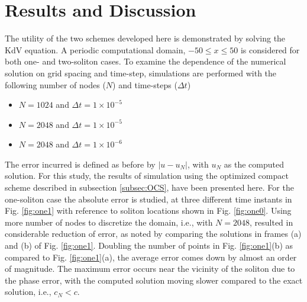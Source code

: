 \documentclass{svjour3}                    %
\begin{document}
\section{Results and Discussion}
\label{sec:res}
The utility of the two schemes developed here is demonstrated by solving the KdV equation. A periodic computational domain, $-50\leq x \leq 50$ is 
considered for both one- and two-soliton cases. To examine the dependence of the numerical solution on grid spacing and time-step, simulations are performed with the following number of nodes ($N$) and time-steps ($\Delta t$)
\begin{itemize}
  \item $N=1024$ and $\Delta t = 1 \times 10^{-5}$
  \item $N=2048$ and $\Delta t = 1 \times 10^{-5}$
  \item $N=2048$ and $\Delta t = 1 \times 10^{-6}$
\end{itemize}
The error incurred is defined as before by $|u - u_N|$, with $u_N$ as the computed solution. For this study, the results of simulation using the optimized compact scheme described in subsection \ref{subsec:OCS}, have been presented here.
For the one-soliton case the absolute error is studied, at three different time instants in Fig. \ref{fig:one1} with reference to soliton locations shown in Fig. \ref{fig:one0}.
Using more number of nodes to discretize the domain, i.e., with $N=2048$, resulted in considerable reduction of error, as noted by comparing the 
solutions in frames (a) and (b) of Fig. \ref{fig:one1}.  Doubling the number of points in Fig. 
\ref{fig:one1}(b) as compared to Fig. \ref{fig:one1}(a), the average error comes down by almost an order of magnitude. The maximum error occurs
near the vicinity of the soliton due to the phase error, with the computed solution moving slower compared to the exact solution, i.e., $c_N < c$. 
\end{document}
